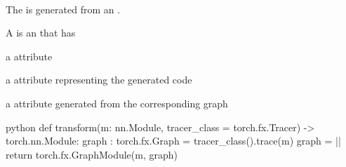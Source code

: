 \begin{defnbox}\nospacing
    \begin{defn}\label{defn:torch_fx_code_generation}\leavevmode\\
        The  is generated from an .


        A  is an  that has
        \begin{itemizenosep}
            \item a  attribute
            \item a  attribute representing the generated code
            \item a  attribute generated from the corresponding graph
        \end{itemizenosep}
        \begin{mintlinebox}{python}
            def transform(m: nn.Module, tracer_class = torch.fx.Tracer)
                    -> torch.nn.Module:
              graph : torch.fx.Graph = tracer_class().trace(m)
              graph = |\texttt{}|
              return torch.fx.GraphModule(m, graph)
        \end{mintlinebox}
    \end{defn}
\end{defnbox}


